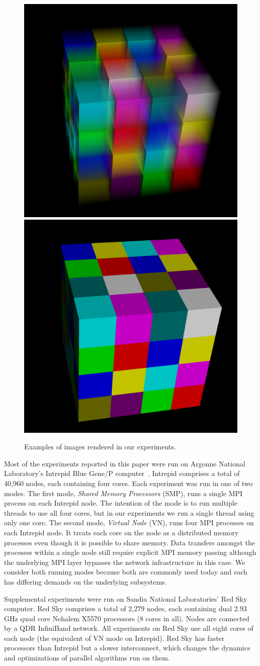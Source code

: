 \documentclass{acm_proc_article-sp}
\newcommand*{\lcite}[1]{~\cite{#1}}
\newcommand*{\keyterm}[1]{\emph{#1}}
\begin{document}
\begin{figure}[htbp]
  \centering
  \includegraphics[width=.4\linewidth]{images/TransparentOutput}
  \quad
  \includegraphics[width=.4\linewidth]{images/OpaqueOutput}
  \caption{Examples of images rendered in our experiments.}
  \label{fig:SimpleTimingOutput}
\end{figure}

Most of the experiments reported in this paper were run on Argonne National
Laboratory's Intrepid Blue Gene/P computer\lcite{BlueGeneP}.  Intrepid
comprises a total of 40,960 nodes, each containing four cores.  Each
experiment was run in one of two modes.  The first mode, \keyterm{Shared
  Memory Processors} (SMP), runs a single MPI process on each Intrepid
node.  The intention of the mode is to run multiple threads to use all four
cores, but in our experiments we run a single thread using only one core.
The second mode, \keyterm{Virtual Node} (VN), runs four MPI processes on
each Intrepid node.  It treats each core on the node as a distributed
memory processes even though it is possible to share memory.  Data
transfers amongst the processes within a single node still require explicit
MPI memory passing although the underlying MPI layer bypasses the network
infrastructure in this case.  We consider both running modes because both
are commonly used today and each has differing demands on the underlying
subsystems.

Supplemental experiments were run on Sandia National Laboratories' Red Sky
computer.  Red Sky comprises a total of 2,279 nodes, each containing dual
2.93 GHz quad core Nehalem X5570 processors (8 cores in all).  Nodes are
connected by a QDR InfiniBand network.  All experiments on Red Sky use all
eight cores of each node (the equivalent of VN mode on Intrepid).  Red Sky
has faster processors than Intrepid but a slower interconnect, which
changes the dynamics and optimizations of parallel algorithms run on them.
\end{document}
